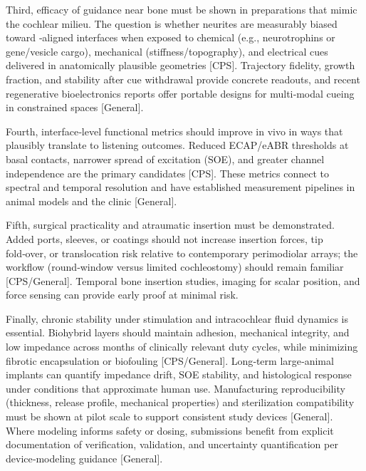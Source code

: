 Third, efficacy of guidance near bone must be shown in preparations that mimic the cochlear milieu. The question is whether neurites are measurably biased toward \CPS‑aligned interfaces when exposed to chemical (e.g., neurotrophins or gene/vesicle cargo), mechanical (stiffness/topography), and electrical cues delivered in anatomically plausible geometries [CPS]. Trajectory fidelity, growth fraction, and stability after cue withdrawal provide concrete readouts, and recent regenerative bioelectronics reports offer portable designs for multi‑modal cueing in constrained spaces [General].\cite{Kempfle2021, StPeter2022, Chang2020, Scheper2019, tan2012, CarnicerLombarte2024AdvMat}

Fourth, interface‑level functional metrics should improve in vivo in ways that plausibly translate to listening outcomes. Reduced ECAP/eABR thresholds at basal contacts, narrower spread of excitation (SOE), and greater channel independence are the primary candidates [CPS]. These metrics connect to spectral and temporal resolution and have established measurement pipelines in animal models and the clinic [General].\cite{wilson2008, wilson2014, Micco2006, Rebscher2008}

Fifth, surgical practicality and atraumatic insertion must be demonstrated. Added ports, sleeves, or coatings should not increase insertion forces, tip fold‑over, or translocation risk relative to contemporary perimodiolar arrays; the workflow (round‑window versus limited cochleostomy) should remain familiar [CPS/General]. Temporal bone insertion studies, imaging for scalar position, and force sensing can provide early proof at minimal risk.\cite{Rebscher2008, Sheykholeslami2002}

Finally, chronic stability under stimulation and intracochlear fluid dynamics is essential. Biohybrid layers should maintain adhesion, mechanical integrity, and low impedance across months of clinically relevant duty cycles, while minimizing fibrotic encapsulation or biofouling [CPS/General]. Long‑term large‑animal implants can quantify impedance drift, SOE stability, and histological response under conditions that approximate human use.\cite{Dalrymple2020, Horne2023} Manufacturing reproducibility (thickness, release profile, mechanical properties) and sterilization compatibility must be shown at pilot scale to support consistent study devices [General]. Where modeling informs safety or dosing, submissions benefit from explicit documentation of verification, validation, and uncertainty quantification per device‑modeling guidance [General].\cite{USFDA2021InSilico}

